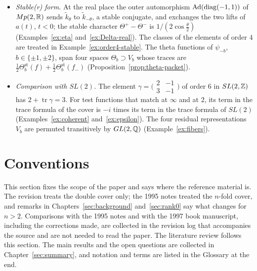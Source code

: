\begin{itemize}
  (Example~\ref{ex:Phi-real}). The only bad place is $2$, where the
  normalizing factor is not computed in Chapter~\ref{sec:invariant}; by
  Proposition~\normref{}(c) it is a constant times $L_2(2\lambda,\chi_2^2)/
  L_2(2\lambda+1,\chi_2^2)$. The discrete correction is
  $-\frac14\sum_{b=\pm1,\pm2}\operatorname{tr}I(\chi_{\psi_b,0},f)$
  (Example~\ref{ex:itf-Q}).
\item \emph{Stable(r) form.} At the real place the outer automorphism
  $\operatorname{Ad}(\operatorname{diag}(-1,1))$ of $Mp(2,\mathbb{R})$ sends $\tilde k_\theta$ to
  $\tilde k_{-\theta}$, a stable conjugate, and exchanges the two lifts of
  $a(t)$, $t<0$; the stable character $\Theta^+-\Theta^-$ is
  $1/(2\cos\frac\theta2)$ (Examples~\ref{ex:eta} and~\ref{ex:Delta-real}).
  The classes of the elements of order $4$ are treated in
  Example~\ref{ex:order4-stable}. The theta functions of $\psi_{-b}$,
  $b\in\{\pm1,\pm2\}$, span four spaces $\Theta_b\supset V_b$ whose traces
  are $\frac12\Theta^{\mathrm{st}}_b(f)+\frac12\Theta^{\mathrm{st}}_b(f_-)$
  (Proposition~\ref{prop:theta-packet}).
\item \emph{Comparison with $SL(2)$.} The element $\gamma=\bigl(
  \begin{smallmatrix}2&-1\\3&-1\end{smallmatrix}\bigr)$ of order $6$ in
  $SL(2,\mathbb{Z})$ has $2+\operatorname{tr}\gamma=3$. For test functions that
  match at $\infty$ and at $2$, its term in the trace formula of the cover
  is $-i$ times its term in the trace formula of $SL(2)$
  (Examples~\ref{ex:coherent} and~\ref{ex:epsilon}). The four residual
  representations $V_b$ are permuted transitively by $GL(2,\mathbb{Q})$
  (Example~\ref{ex:fibers}).
\end{itemize}

\section{Conventions}\label{sec:conventions-intro}

This section fixes the scope of the paper and says where the
reference material is.
The revision treats the double cover only; the 1995 notes treated the
$n$-fold cover, and remarks in Chapters~\ref{sec:background}
and~\ref{sec:rank0} say what changes for $n>2$. Comparisons with the
1995 notes and with the 1997 book manuscript, including the corrections
made, are collected in the revision log that accompanies the source and
are not needed to read the paper. The literature review follows this
section. The main results and the open questions are collected in
Chapter~\ref{sec:summary}, and notation and terms are listed in the
Glossary at the end.


